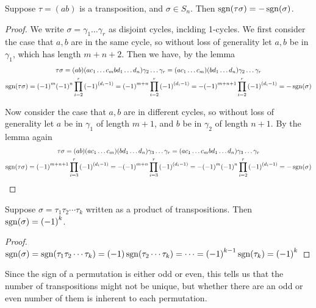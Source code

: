 \begin{proposition}
    Suppose \(\tau = (ab)\) is a transposition, and \(\sigma \in S_n\).
    Then \(\operatorname{sgn}(\tau\sigma) = -\operatorname{sgn}(\sigma)\).
\end{proposition}
\begin{proof}
    We write \(\sigma = \gamma_1\hdots\gamma_r\) as disjoint cycles,
    inclding 1-cycles.
    We first consider the case that \(a,b\) are in the same cycle,
    so without loss of generality let \(a,b\) be in \(\gamma_1\),
    which has length \(m+n+2\).
    Then we have, by the lemma
    \begin{gather*}
        \tau\sigma
        = (ab)(ac_1 \hdots c_m bd_1 \hdots d_n)\gamma_2\hdots\gamma_r
        = (ac_1 \hdots c_m)(bd_1 \hdots d_n)\gamma_2\hdots\gamma_r \\
        \operatorname{sgn}(\tau\sigma)
        = {(-1)}^m{(-1)}^n \prod_{i=2}^r {(-1)}^{(d_i-1)}
        = {(-1)}^{m+n} \prod_{i=2}^r {(-1)}^{(d_i-1)}
        = -{(-1)}^{m+n+1} \prod_{i=2}^r {(-1)}^{(d_i-1)}
        = -\operatorname{sgn}(\sigma)
    \end{gather*}

    Now consider the case that \(a,b\) are in different cycles,
    so without loss of generality
    let \(a\) be in \(\gamma_1\) of length \(m+1\),
    and \(b\) be in \(\gamma_2\) of length \(n+1\).
    By the lemma again
    \begin{gather*}
        \tau\sigma
        = (ab)(ac_1 \hdots c_m)(bd_1 \hdots d_n)\gamma_3\hdots\gamma_r
        = (ac_1 \hdots c_m bd_1 \hdots d_n)\gamma_3\hdots\gamma_r \\
        \operatorname{sgn}(\tau\sigma)
        = {(-1)}^{m+n+1} \prod_{i=3}^r {(-1)}^{(d_i-1)}
        = -{(-1)}^{m+n} \prod_{i=3}^r {(-1)}^{(d_i-1)}
        = -{(-1)}^m{(-1)}^n \prod_{i=2}^r {(-1)}^{(d_i-1)}
        = -\operatorname{sgn}(\sigma)
    \end{gather*}
\end{proof}
\begin{corollary}\label{cor:sgn-transposition}
    Suppose \(\sigma = \tau_1\tau_2\cdots\tau_k\)
    written as a product of transpositions.
    Then \(\operatorname{sgn}(\sigma) = {(-1)}^k\).
\end{corollary}
\begin{proof}
    \(\operatorname{sgn}(\sigma) = \operatorname{sgn}(\tau_1\tau_2\cdots\tau_k)
    = (-1)\operatorname{sgn}(\tau_2\cdots\tau_k)
    = \cdots = {(-1)}^{k-1}\operatorname{sgn}(\tau_k)
    = {(-1)}^k\)
\end{proof}
\begin{remark}
    Since the sign of a permutation is either odd or even,
    this tells us that the number of transpositions might not be unique,
    but whether there are an odd or even number of them
    is inherent to each permutation.
\end{remark}

